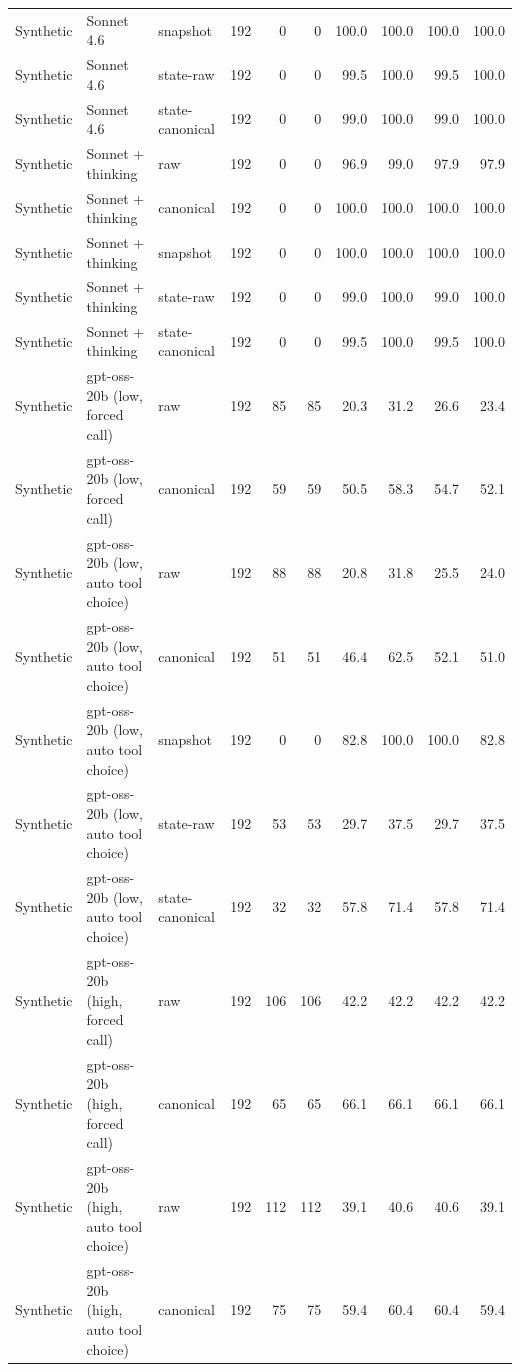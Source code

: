 {\begin{longtable}{lllrrrrrrr}
Synthetic & Sonnet 4.6 & snapshot & 192 & 0 & 0 & 100.0 & 100.0 & 100.0 & 100.0 \\
Synthetic & Sonnet 4.6 & state-raw & 192 & 0 & 0 & 99.5 & 100.0 & 99.5 & 100.0 \\
Synthetic & Sonnet 4.6 & state-canonical & 192 & 0 & 0 & 99.0 & 100.0 & 99.0 & 100.0 \\
Synthetic & Sonnet + thinking & raw & 192 & 0 & 0 & 96.9 & 99.0 & 97.9 & 97.9 \\
Synthetic & Sonnet + thinking & canonical & 192 & 0 & 0 & 100.0 & 100.0 & 100.0 & 100.0 \\
Synthetic & Sonnet + thinking & snapshot & 192 & 0 & 0 & 100.0 & 100.0 & 100.0 & 100.0 \\
Synthetic & Sonnet + thinking & state-raw & 192 & 0 & 0 & 99.0 & 100.0 & 99.0 & 100.0 \\
Synthetic & Sonnet + thinking & state-canonical & 192 & 0 & 0 & 99.5 & 100.0 & 99.5 & 100.0 \\
Synthetic & gpt-oss-20b (low, forced call) & raw & 192 & 85 & 85 & 20.3 & 31.2 & 26.6 & 23.4 \\
Synthetic & gpt-oss-20b (low, forced call) & canonical & 192 & 59 & 59 & 50.5 & 58.3 & 54.7 & 52.1 \\
Synthetic & gpt-oss-20b (low, auto tool choice) & raw & 192 & 88 & 88 & 20.8 & 31.8 & 25.5 & 24.0 \\
Synthetic & gpt-oss-20b (low, auto tool choice) & canonical & 192 & 51 & 51 & 46.4 & 62.5 & 52.1 & 51.0 \\
Synthetic & gpt-oss-20b (low, auto tool choice) & snapshot & 192 & 0 & 0 & 82.8 & 100.0 & 100.0 & 82.8 \\
Synthetic & gpt-oss-20b (low, auto tool choice) & state-raw & 192 & 53 & 53 & 29.7 & 37.5 & 29.7 & 37.5 \\
Synthetic & gpt-oss-20b (low, auto tool choice) & state-canonical & 192 & 32 & 32 & 57.8 & 71.4 & 57.8 & 71.4 \\
Synthetic & gpt-oss-20b (high, forced call) & raw & 192 & 106 & 106 & 42.2 & 42.2 & 42.2 & 42.2 \\
Synthetic & gpt-oss-20b (high, forced call) & canonical & 192 & 65 & 65 & 66.1 & 66.1 & 66.1 & 66.1 \\
Synthetic & gpt-oss-20b (high, auto tool choice) & raw & 192 & 112 & 112 & 39.1 & 40.6 & 40.6 & 39.1 \\
Synthetic & gpt-oss-20b (high, auto tool choice) & canonical & 192 & 75 & 75 & 59.4 & 60.4 & 60.4 & 59.4 \\

\end{longtable}}
